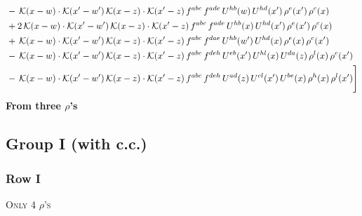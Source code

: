 \documentclass[9pt]{article}
\numberwithin{equation}{section}
\begin{document}
\begin{align}
&-\,\mathcal{K}(x-w)\cdot\mathcal{K}(x'-w')\,\mathcal{K}(x-z)\cdot\mathcal{K}(x'-z)\,f^{abc}\,f^{ade}\,U^{hb}(w)\,U^{hd}(x')\,\rho^{e}(x')\,\rho^{c}(x)\notag\\
&+2\,\mathcal{K}(x-w)\cdot\mathcal{K}(x'-w')\,\mathcal{K}(x-z)\cdot\mathcal{K}(x'-z)\,f^{abc}\,f^{ade}\,U^{hb}(x)\,U^{hd}(x')\,\rho^{e}(x')\,\rho^{c}(x)\notag\\
&+\,\mathcal{K}(x-w)\cdot\mathcal{K}(x'-w')\,\mathcal{K}(x-z)\cdot\mathcal{K}(x'-z)\,f^{abc}\,f^{dae}\,U^{hb}(w')\,U^{hd}(x)\,\rho^{e}(x)\,\rho^{c}(x')\notag\\
&-\,\mathcal{K}(x-w)\cdot\mathcal{K}(x'-w')\,\mathcal{K}(x-z)\cdot\mathcal{K}(x'-z)\,f^{abc}\,f^{deh}\,U^{eb}(x')\,U^{hl}(x)\,U^{da}(z)\,\rho^{l}(x)\,\rho^{c}(x')\notag\\
&-\,\mathcal{K}(x-w)\cdot\mathcal{K}(x'-w')\,\mathcal{K}(x-z)\cdot\mathcal{K}(x'-z)\,f^{abc}\,f^{deh}\,U^{ad}(z)\,U^{cl}(x')\,U^{be}(x)\,\rho^{h}(x)\,\rho^{l}(x')\Bigg]
\end{align}
\textbf{From three $\rho$'s}
\subsection{Group I (with c.c.)}
\subsubsection{Row I}
\textsc{Only 4 $\rho$'s}
\end{document}
